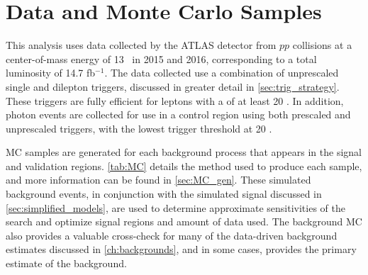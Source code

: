 \section{Data and Monte Carlo Samples} 

This analysis uses data collected by the \ac{ATLAS} detector from $pp$ collisions at a center-of-mass energy of 13 \tev~in 2015 and 2016, corresponding to a total luminosity of 14.7 fb$^{-1}$. The data collected use a combination of unprescaled single and dilepton triggers, discussed in greater detail in \autoref{sec:trig_strategy}. These triggers are fully efficient for leptons with a \pt of at least 20 \gev. In addition, photon events are collected for use in a control region using both prescaled and unprescaled triggers, with the lowest trigger threshold at 20 \gev. 

\ac{MC} samples are generated for each background process that appears in the signal and validation regions. \autoref{tab:MC} details the method used to produce each sample, and more information can be found in \autoref{sec:MC_gen}. These simulated background events, in conjunction with the simulated signal discussed in \autoref{sec:simplified_models}, are used to determine approximate sensitivities of the search and optimize signal regions and amount of data used. The background \ac{MC} also provides a valuable cross-check for many of the data-driven background estimates discussed in \autoref{ch:backgrounds}, and in some cases, provides the primary estimate of the background.

